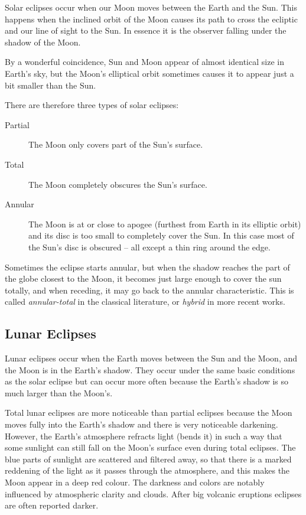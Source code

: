 Solar eclipses occur when our Moon moves between the Earth and the Sun.
This happens when the inclined orbit of the Moon causes its path to
cross the ecliptic and our line of sight to the Sun. In essence it is the observer
falling under the shadow of the Moon. 

By a wonderful coincidence, Sun and Moon appear of almost identical
size in Earth's sky, but the Moon's elliptical orbit sometimes causes
it to appear just a bit smaller than the Sun.

There are therefore three types of solar eclipses:
\begin{description}
\item[Partial] The Moon only covers part of the Sun's surface.
\item[Total] The Moon completely obscures the Sun's surface.
\item[Annular] The Moon is at or close to apogee (furthest from Earth in its
elliptic orbit) and its disc is too small to completely cover the Sun.
In this case most of the Sun's disc is obscured -- all except a thin ring
around the edge.
\end{description}
Sometimes the eclipse starts annular, but when the shadow reaches the
part of the globe closest to the Moon, it becomes just large enough to
cover the sun totally, and when receding, it may go back to the
annular characteristic. This is called \emph{annular-total} in the
classical literature, or \emph{hybrid} in more recent works.

\subsection{Lunar Eclipses}
\label{sec:Eclipses:lunar}

Lunar eclipses occur when the Earth moves between the Sun and the Moon,
and the Moon is in the Earth's shadow. They occur under the same basic
conditions as the solar eclipse but can occur more often because the
Earth's shadow is so much larger than the Moon's.

Total lunar eclipses are more noticeable than partial eclipses because
the Moon moves fully into the Earth's shadow and there is very
noticeable darkening. However, the Earth's atmosphere refracts light
(bends it) in such a way that some sunlight can still fall on the Moon's
surface even during total eclipses. The blue parts of sunlight are scattered and filtered away, 
so that there is a marked reddening of the light as it passes through the atmosphere, and this 
makes the Moon appear in a deep red colour. The darkness and colors are notably influenced by 
atmospheric clarity and clouds. After big volcanic eruptions eclipses are often reported darker.



